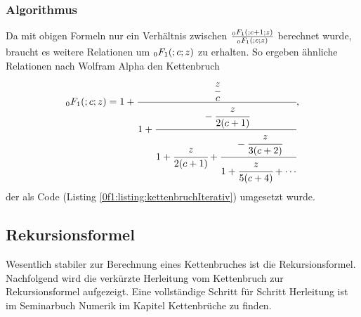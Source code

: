\subsubsection{Algorithmus}
Da mit obigen Formeln nur ein Verhältnis zwischen
$\frac{\mathstrut_0F_1(;c+1;z)}{\mathstrut_0F_1(;c;z)}$
berechnet wurde, braucht es weitere Relationen um $\mathstrut_0F_1(;c;z)$
zu erhalten.
So ergeben ähnliche Relationen nach Wolfram Alpha \cite{0f1:wolfram-0f1} den Kettenbruch
\begin{equation}
	\label{0f1:math:kettenbruch:0f1:eq}
	\mathstrut_0F_1(;c;z) = 1 + \cfrac{\cfrac{z}{c}}{1+\cfrac{-\cfrac{z}{2(c+1)}}{1+\cfrac{z}{2(c+1)}+\cfrac{-\cfrac{z}{3(c+2)}}{1+\cfrac{z}{5(c+4)} + \cdots}}},
\end{equation}
der als Code (Listing \ref{0f1:listing:kettenbruchIterativ})  umgesetzt wurde. 



\subsection{Rekursionsformel
\label{0f1:subsection:rekursionsformel}}
Wesentlich stabiler zur Berechnung eines Kettenbruches ist die
Rekursionsformel.
%
Nachfolgend wird die verkürzte Herleitung vom
Kettenbruch zur Rekursionsformel aufgezeigt.
Eine vollständige Schritt für Schritt Herleitung ist im Seminarbuch Numerik
\cite{0f1:kettenbrueche}
im Kapitel Kettenbrüche zu finden.

